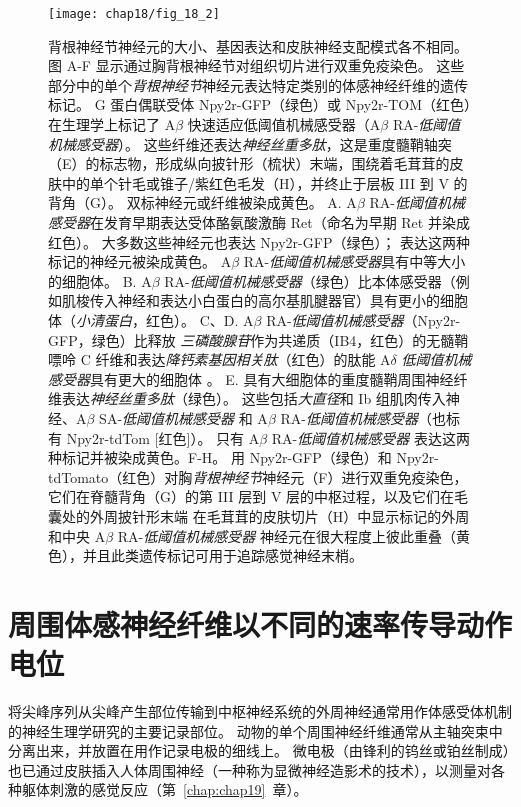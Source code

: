 \begin{figure}[htbp]
	\centering
	\texttt{[image: chap18/fig\_18\_2]}
	\caption{背根神经节神经元的大小、基因表达和皮肤神经支配模式各不相同\cite{li2011functional}。
		图 A-F 显示通过胸背根神经节对组织切片进行双重免疫染色。
		这些部分中的单个\textit{背根神经节}神经元表达特定类别的体感神经纤维的遗传标记。
		G 蛋白偶联受体 Npy2r-GFP（绿色）或 Npy2r-TOM（红色）在生理学上标记了 A$\beta$ 快速适应低阈值机械感受器（A$\beta$ RA-\textit{低阈值机械感受器}）。
		这些纤维还表达\textit{神经丝重多肽}，这是重度髓鞘轴突（E）的标志物，形成纵向披针形（梳状）末端，围绕着毛茸茸的皮肤中的单个针毛或锥子/紫红色毛发（H），并终止于层板 III 到 V 的背角（G）。 
		双标神经元或纤维被染成黄色。
		A. A$\beta$ RA-\textit{低阈值机械感受器}在发育早期表达受体酪氨酸激酶 Ret（命名为早期 Ret 并染成红色）。
		大多数这些神经元也表达 Npy2r-GFP（绿色）；
		表达这两种标记的神经元被染成黄色。 A$\beta$ RA-\textit{低阈值机械感受器}具有中等大小的细胞体。
		B. A$\beta$ RA-\textit{低阈值机械感受器}（绿色）比本体感受器（例如肌梭传入神经和表达小白蛋白的高尔基肌腱器官）具有更小的细胞体（\textit{小清蛋白}，红色）。
		C、D. A$\beta$ RA-\textit{低阈值机械感受器}（Npy2r-GFP，绿色）比释放 \textit{三磷酸腺苷}作为共递质（IB4，红色）的无髓鞘嘌呤 C 纤维和表达\textit{降钙素基因相关肽}（红色）的肽能 A$\delta$ \textit{低阈值机械感受器}具有更大的细胞体 。
		E. 具有大细胞体的重度髓鞘周围神经纤维表达\textit{神经丝重多肽}（绿色）。
		这些包括\textit{大直径}和 Ib 组肌肉传入神经、A$\beta$ SA-\textit{低阈值机械感受器} 和 A$\beta$ RA-\textit{低阈值机械感受器}（也标有 Npy2r-tdTom [红色]）。
		只有 A$\beta$ RA-\textit{低阈值机械感受器} 表达这两种标记并被染成黄色。F-H。
		用 Npy2r-GFP（绿色）和 Npy2r-tdTomato（红色）对胸\textit{背根神经节}神经元（F）进行双重免疫染色，它们在脊髓背角（G）的第 III 层到 V 层的中枢过程，以及它们在毛囊处的外周披针形末端 在毛茸茸的皮肤切片（H）中显示标记的外周和中央 A$\beta$ RA-\textit{低阈值机械感受器} 神经元在很大程度上彼此重叠（黄色），并且此类遗传标记可用于追踪感觉神经末梢。}
	\label{fig:18_2}
\end{figure}



\section{周围体感神经纤维以不同的速率传导动作电位}

将尖峰序列从尖峰产生部位传输到中枢神经系统的外周神经通常用作体感受体机制的神经生理学研究的主要记录部位。
动物的单个周围神经纤维通常从主轴突束中分离出来，并放置在用作记录电极的细线上。
微电极（由锋利的钨丝或铂丝制成）也已通过皮肤插入人体周围神经（一种称为显微神经造影术的技术），以测量对各种躯体刺激的感觉反应（第~\ref{chap:chap19}~章）。


